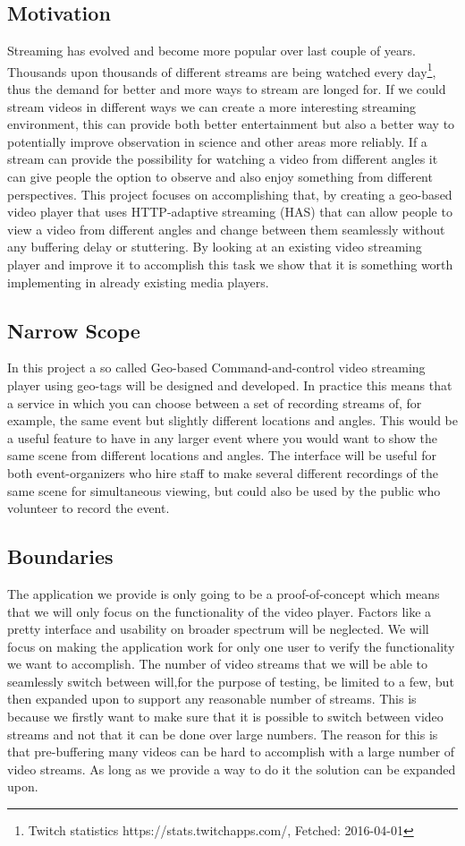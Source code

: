 \documentclass[9pt,a4paper]{acmproc}
\begin{document}
\subsection{Motivation}
Streaming has evolved and become more popular over last couple of years. Thousands upon thousands of different streams are being watched every day\footnote{Twitch statistics https://stats.twitchapps.com/, Fetched: 2016-04-01}, thus the demand for better and more ways to stream are longed for. If we could stream videos in different ways we can create a more interesting streaming environment, this can provide both better entertainment but also a better way to potentially improve observation in science and other areas more reliably. If a stream can provide the possibility for watching a video from different angles it can give people the option to observe and also enjoy something from different perspectives. This project focuses on accomplishing that, by creating a geo-based video player that uses HTTP-adaptive streaming (HAS) that can allow people to view a video from different angles and change between them seamlessly without any buffering delay or stuttering. By looking at an existing video streaming player and improve it to accomplish this task we show that it is something worth implementing in already existing media players.

\subsection{Narrow Scope}
In this project a so called Geo-based Command-and-control video streaming player using geo-tags will be designed and developed. In practice this means that a service in which you can choose between a set of recording streams of, for example, the same event but slightly different locations and angles. This would be a useful feature to have in any larger event where you would want to show the same scene from different locations and angles. The interface will be useful for both event-organizers who hire staff to make several different recordings of the same scene for simultaneous viewing, but could also be used by the public who volunteer to record the event.

\subsection{Boundaries}
The application we provide is only going to be a proof-of-concept which means that we will only focus on the functionality of the video player. Factors like a pretty interface and usability on broader spectrum will be neglected. We will focus on making the application work for only one user to verify the functionality we want to accomplish. The number of video streams that we will be able to seamlessly switch between will,for the purpose of testing, be limited to a few, but then expanded upon to support any reasonable number of streams. This is because we firstly want to make sure that it is possible to switch between video streams and not that it can be done over large numbers. The reason for this is that pre-buffering many videos can be hard to accomplish with a large number of video streams. As long as we provide a way to do it the solution can be expanded upon.
\end{document}
